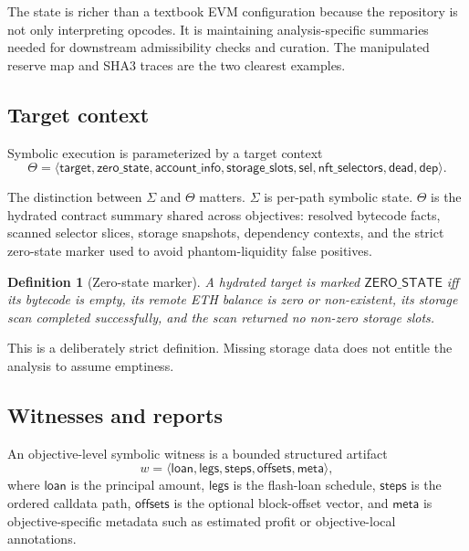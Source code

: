 \documentclass[11pt]{article}
\numberwithin{equation}{section}
\newtheorem{definition}{Definition}[section]
\theoremstyle{remark}
\newcommand{\Ctx}{\Theta}
\newcommand{\Selectors}{\mathsf{sel}}
\newcommand{\DeadEnds}{\mathsf{dead}}
\newcommand{\Dependencies}{\mathsf{dep}}
\newcommand{\ZeroState}{\mathsf{ZERO\_STATE}}
\begin{document}
The state is richer than a textbook EVM configuration because the repository is not only interpreting opcodes. It is maintaining analysis-specific summaries needed for downstream admissibility checks and curation. The manipulated reserve map and SHA3 traces are the two clearest examples.

\subsection{Target context}

Symbolic execution is parameterized by a target context
\begin{equation}
\label{eq:target-context}
\Ctx
=
\langle
\mathsf{target},
\mathsf{zero\_state},
\mathsf{account\_info},
\mathsf{storage\_slots},
\Selectors,
\mathsf{nft\_selectors},
\DeadEnds,
\Dependencies
\rangle.
\end{equation}

The distinction between \(\Sigma\) and \(\Ctx\) matters. \(\Sigma\) is per-path symbolic state. \(\Ctx\) is the hydrated contract summary shared across objectives: resolved bytecode facts, scanned selector slices, storage snapshots, dependency contexts, and the strict zero-state marker used to avoid phantom-liquidity false positives.

\begin{definition}[Zero-state marker]
\label{def:zero-state}
A hydrated target is marked \(\ZeroState\) iff its bytecode is empty, its remote ETH balance is zero or non-existent, its storage scan completed successfully, and the scan returned no non-zero storage slots.
\end{definition}

This is a deliberately strict definition. Missing storage data does not entitle the analysis to assume emptiness.

\subsection{Witnesses and reports}

An objective-level symbolic witness is a bounded structured artifact
\begin{equation}
\label{eq:witness-shape}
w = \langle \mathsf{loan}, \mathsf{legs}, \mathsf{steps}, \mathsf{offsets}, \mathsf{meta} \rangle,
\end{equation}
where \(\mathsf{loan}\) is the principal amount, \(\mathsf{legs}\) is the flash-loan schedule, \(\mathsf{steps}\) is the ordered calldata path, \(\mathsf{offsets}\) is the optional block-offset vector, and \(\mathsf{meta}\) is objective-specific metadata such as estimated profit or objective-local annotations.
\end{document}
